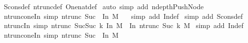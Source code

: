 \begin{isabellebody}
%
\isadelimproof
%
\endisadelimproof
%
\isatagproof
{}\isamarkupfalse%
\ Scons{\isacharunderscore}def\ ntrunc{\isacharunderscore}def\ One{\isacharunderscore}nat{\isacharunderscore}def\isanewline
{}\isamarkupfalse%
\ {\isacharparenleft}auto\ simp\ add{\isacharcolon}\ ndepth{\isacharunderscore}Push{\isacharunderscore}Node{\isacharparenright}%
\endisatagproof
{\isafoldproof}%
%
\isadelimproof
\isanewline
%
\endisadelimproof
\isanewline
\isanewline
\isanewline
\isanewline
\isanewline
{}\isamarkupfalse%
\ ntrunc{\isacharunderscore}one{\isacharunderscore}In{}\ {\isacharbrackleft}simp{\isacharbrackright}{\isacharcolon}\ {\isachardoublequoteopen}ntrunc\ {\isacharparenleft}Suc\ {}{\isacharparenright}\ {\isacharparenleft}In{}\ M{\isacharparenright}\ {\isacharequal}\ {\isacharbraceleft}{\isacharbraceright}{\isachardoublequoteclose}\isanewline
%
\isadelimproof
%
\endisadelimproof
%
\isatagproof
{}\isamarkupfalse%
\ {\isacharparenleft}simp\ add{\isacharcolon}\ In{}{\isacharunderscore}def{\isacharparenright}\isanewline
{}\isamarkupfalse%
\ {\isacharparenleft}simp\ add{\isacharcolon}\ Scons{\isacharunderscore}def{\isacharparenright}\isanewline
{}\isamarkupfalse%
%
\endisatagproof
{\isafoldproof}%
%
\isadelimproof
\isanewline
%
\endisadelimproof
\isanewline
{}\isamarkupfalse%
\ ntrunc{\isacharunderscore}In{}\ {\isacharbrackleft}simp{\isacharbrackright}{\isacharcolon}\ {\isachardoublequoteopen}ntrunc\ {\isacharparenleft}Suc{\isacharparenleft}Suc\ k{\isacharparenright}{\isacharparenright}\ {\isacharparenleft}In{}\ M{\isacharparenright}\ {\isacharequal}\ In{}\ {\isacharparenleft}ntrunc\ {\isacharparenleft}Suc\ k{\isacharparenright}\ M{\isacharparenright}{\isachardoublequoteclose}\isanewline
%
\isadelimproof
%
\endisadelimproof
%
\isatagproof
{}\isamarkupfalse%
\ {\isacharparenleft}simp\ add{\isacharcolon}\ In{}{\isacharunderscore}def{\isacharparenright}%
\endisatagproof
{\isafoldproof}%
%
\isadelimproof
\isanewline
%
\endisadelimproof
\isanewline
{}\isamarkupfalse%
\ ntrunc{\isacharunderscore}one{\isacharunderscore}In{}\ {\isacharbrackleft}simp{\isacharbrackright}{\isacharcolon}\ {\isachardoublequoteopen}ntrunc\ {\isacharparenleft}Suc\ {}{\isacharparenright}\ {\isacharparenleft}In{}\ M{\isacharparenright}\ {\isacharequal}\ {\isacharbraceleft}{\isacharbraceright}{\isachardoublequoteclose}\isanewline
%
\isadelimproof

\end{isabellebody}
